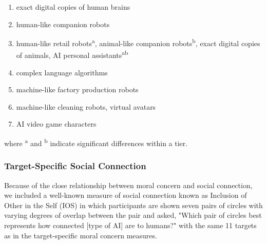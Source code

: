 \documentclass[manuscript,screen,review,nonacm]{acmart}
\begin{document}
\begin{enumerate}
    \item exact digital copies of human brains
    \item human-like companion robots
    \item human-like retail robots\textsuperscript{a}, animal-like companion robots\textsuperscript{b}, exact digital copies of animals, AI personal assistants\textsuperscript{a}\textsuperscript{b}
    \item complex language algorithms
    \item machine-like factory production robots
    \item machine-like cleaning robots, virtual avatars
    \item AI video game characters
\end{enumerate}

where \textsuperscript{a} and \textsuperscript{b} indicate significant differences within a tier.

\subsubsection{Target-Specific Social Connection}

Because of the close relationship between moral concern and social connection, we included a well-known measure of social connection known as Inclusion of Other in the Self (IOS) \cite{aron92} in which participants are shown seven pairs of circles with varying degrees of overlap between the pair and asked, "Which pair of circles best represents how connected [type of AI] are to humans?" with the same 11 targets as in the target-specific moral concern measures.

\setlength\LTleft{-3cm}
\end{document}
